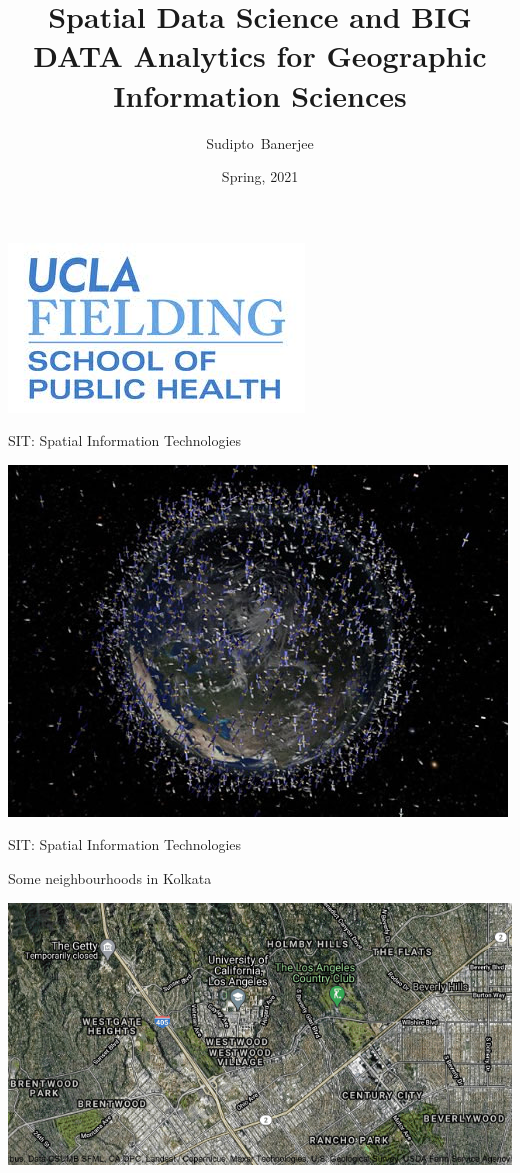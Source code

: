 \documentclass[
10pt]{beamer}
\title[BIOSTAT 241]{Spatial Data Science and BIG DATA Analytics for Geographic Information Sciences}
\author[Sudipto~Banerjee]{Sudipto~Banerjee}
\institute[UCLA] %
{
  Professor and Chair of Biostatistics \\
  Professor of Statistics \\
  Affiliate Member, Institute of the Environment \& Sustainability\\
  University of California Los Angeles (UCLA)\\
  sudipto@ucla.edu \\
%
}
\date[Spring, 2021]{Spring, 2021}
\begin{document}
\begin{frame}

  \titlepage

  \includegraphics[height=.5in]{figs/FSPH_logo.jpg}\\

\end{frame}


\begin{frame}{SIT: Spatial Information Technologies}
 
\begin{center}
 \includegraphics[width=\textwidth]{figs/space-debris.jpg}
\end{center}
 
\end{frame}


\begin{frame}{SIT: Spatial Information Technologies}
 
 \begin{center}
  Some neighbourhoods in Kolkata
  
  \medskip
  
  \includegraphics[scale=0.45]{figs/Westwood_Satellite_Map.png}
 \end{center}
 
\end{frame}
\end{document}
